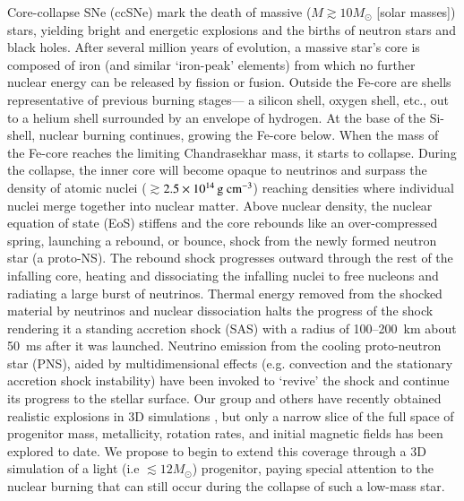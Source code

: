 Core-collapse SNe (ccSNe) mark the death of massive ($M \gtrsim 10
M_{\odot}$ [solar masses]) stars, yielding bright and energetic
explosions and the births of neutron stars and black holes.  After
several million years of evolution, a massive star's core is composed
of iron (and similar `iron-peak' elements) from which no further
nuclear energy can be released by fission or fusion.  Outside the
Fe-core are shells representative of previous burning stages--- a
silicon shell, oxygen shell, etc., out to a helium shell surrounded by
an envelope of hydrogen.  At the base of the Si-shell, nuclear burning
continues, growing the Fe-core below.  When the mass of the Fe-core
reaches the limiting Chandrasekhar mass, it starts to collapse.
During the collapse, the inner core will become opaque to neutrinos
and surpass the density of atomic nuclei
($\gtrsim$$2.5\times10^{14}\,{\mathrm{g~cm^{-3}}}$) reaching densities where
individual nuclei merge together into nuclear matter.  Above nuclear
density, the nuclear equation of state (EoS) stiffens and the core
rebounds like an over-compressed spring, launching a rebound, or
bounce, shock from the newly formed neutron star (a proto-NS).  The
rebound shock progresses outward through the rest of the infalling
core, heating and dissociating the infalling nuclei to free nucleons
and radiating a large burst of neutrinos. Thermal energy removed from
the shocked material by neutrinos and nuclear dissociation halts the
progress of the shock rendering it a standing accretion shock (SAS)
with a radius of 100--200~km about 50~ms after it was
launched. Neutrino emission from the cooling proto-neutron star (PNS),
aided by multidimensional effects (e.g. convection and the stationary
accretion shock instability) have been invoked to `revive' the shock
and continue its progress to the stellar surface.  Our group and
others have recently obtained realistic explosions in
3D simulations \cite{lentzetal2015,melson}, but only a
narrow slice of the full space of progenitor mass, metallicity,
rotation rates, and initial magnetic fields has been explored to
date. We propose to begin to extend this coverage through a 3D
simulation of a light (i.e $\lesssim 12 M_{\odot}$) progenitor, paying
special attention to the nuclear burning that can still occur during
the collapse of such a low-mass star.

